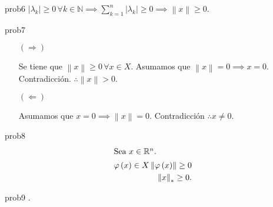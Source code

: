 \begin{sol}{prob6}
    \begin{math}
        \left|
        \lambda_{k}
        \right|\geq
        0\,\forall
        k\in\mathbb{N}\implies
        \sum_{k=1}^{n}
        \left|
        \lambda_{k}
        \right|\geq
        0\implies
        \left\|
        x
        \right\|\geq
        0
    \end{math}.
\end{sol}

\begin{sol}{prob7}
    \leavevmode
    \begin{itemize}
        \item[$\left(\Rightarrow\right)$]

              Se tiene que $\left\|x\right\|\geq 0\,\forall x\in X$.
              Asumamos que $\left\|x\right\|=0\implies x=0$.
              Contradicción.
              $\therefore \left\|x\right\|>0$.

        \item[$\left(\Leftarrow\right)$]

              Asumamos que
              \begin{math}
                  x=
                  0\implies
                  \left\|x\right\|=
                  0
              \end{math}.
              Contradicción
              $\therefore x\neq0$.
    \end{itemize}
\end{sol}

\begin{sol}{prob8}
    \begin{align*}
        \shortintertext{Sea $x\in\mathbb{R}^{n}$.}
        \varphi\left(x\right)\in X
        \left\|\varphi\left(x\right)\right\|\geq
        0 \\
        {\left\|x\right\|}_{\ast}\geq
        0.
    \end{align*}
\end{sol}

\begin{sol}{prob9}
    .
\end{sol}